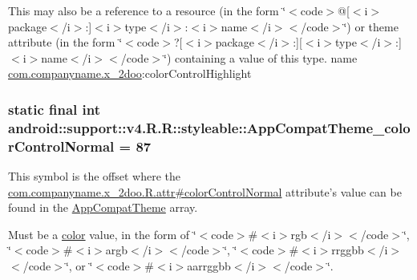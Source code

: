 This may also be a reference to a resource (in the form \char`\"{}$<$code$>$@\mbox{[}$<$i$>$package$<$/i$>$:\mbox{]}$<$i$>$type$<$/i$>$:$<$i$>$name$<$/i$>$$<$/code$>$\char`\"{}) or theme attribute (in the form \char`\"{}$<$code$>$?\mbox{[}$<$i$>$package$<$/i$>$:\mbox{]}\mbox{[}$<$i$>$type$<$/i$>$:\mbox{]}$<$i$>$name$<$/i$>$$<$/code$>$\char`\"{}) containing a value of this type.  name \hyperlink{namespacecom_1_1companyname_1_1x__2doo}{com.companyname.x\_\-2doo}:colorControlHighlight \hypertarget{classandroid_1_1support_1_1v4_1_1_r_1_1styleable_dbb405fc0a9198e2e1ebbedf54fa8518}{
\subsubsection[{AppCompatTheme\_\-colorControlNormal}]{\setlength{\rightskip}{0pt plus 5cm}static final int android::support::v4.R.R::styleable::AppCompatTheme\_\-colorControlNormal = 87}}
\label{classandroid_1_1support_1_1v4_1_1_r_1_1styleable_dbb405fc0a9198e2e1ebbedf54fa8518}


This symbol is the offset where the \hyperlink{classcom_1_1companyname_1_1x__2doo_1_1_r_1_1attr_984b5a46754835de6420fbfc0188980f}{com.companyname.x\_\-2doo.R.attr\#colorControlNormal} attribute's value can be found in the \hyperlink{classandroid_1_1support_1_1v4_1_1_r_1_1styleable_0873e92ba21076bb5a4aeadeb7f5779f}{AppCompatTheme} array.

Must be a \hyperlink{classandroid_1_1support_1_1v4_1_1_r_1_1color}{color} value, in the form of \char`\"{}$<$code$>$\#$<$i$>$rgb$<$/i$>$$<$/code$>$\char`\"{}, \char`\"{}$<$code$>$\#$<$i$>$argb$<$/i$>$$<$/code$>$\char`\"{}, \char`\"{}$<$code$>$\#$<$i$>$rrggbb$<$/i$>$$<$/code$>$\char`\"{}, or \char`\"{}$<$code$>$\#$<$i$>$aarrggbb$<$/i$>$$<$/code$>$\char`\"{}. 

